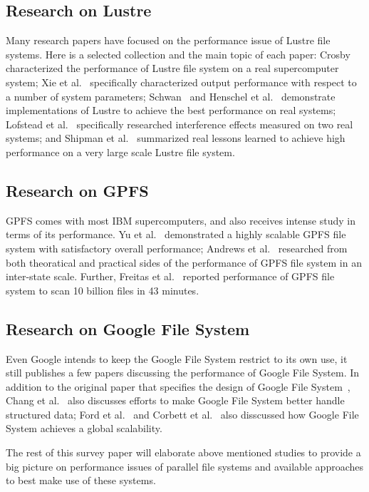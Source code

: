 

\subsection{Research on Lustre}
Many research papers have focused on the performance issue of 
Lustre file systems. 
%
Here is a selected collection and the main topic of each paper:
Crosby~\cite{Crosby2009} characterized the performance of Lustre file system
on a real supercomputer system;
%
Xie et al.~\cite{Xie2012} specifically characterized output performance
with respect to a number of system parameters;
%
Schwan~\cite{Schwan2003} and Henschel et al.~\cite{Henschel2012} 
demonstrate implementations of Lustre to achieve the best performance
on real systems; 
%
Lofstead et al.~\cite{lofstead2010managing} specifically researched interference effects
measured on two real systems; and
%
Shipman et al.~\cite{Shipman2010} summarized real lessons learned 
to achieve high performance on a very large scale Lustre file system.


\subsection{Research on GPFS}
GPFS comes with most IBM supercomputers, and also receives intense study
in terms of its performance.
%
Yu et al.~\cite{Yu2006} demonstrated a highly scalable GPFS file system
with satisfactory overall performance;
%
Andrews et al.~\cite{Andrews2005} researched from both theoratical 
and practical sides of the performance of GPFS file system
in an inter-state scale.
%
Further, Freitas et al.~\cite{freitas2011gpfs} reported performance 
of GPFS file system to scan 10 billion files in 43 minutes. 


\subsection{Research on Google File System}
Even Google intends to keep the Google File System restrict
to its own use, it still publishes a few papers discussing the 
performance of Google File System.
%
In addition to the original paper that specifies the design of
Google File System~\cite{ghemawat2003google},
Chang et al.~\cite{Chang2006a} also discusses efforts to make Google
File System better handle structured data;
Ford et al.~\cite{Ford2010a} and Corbett et al.~\cite{Corbett2012a}
also disscussed how Google File System achieves a global scalability.


The rest of this survey paper will elaborate above mentioned studies 
to provide a big picture on performance issues of parallel file systems
and available approaches to best make use of these systems.
